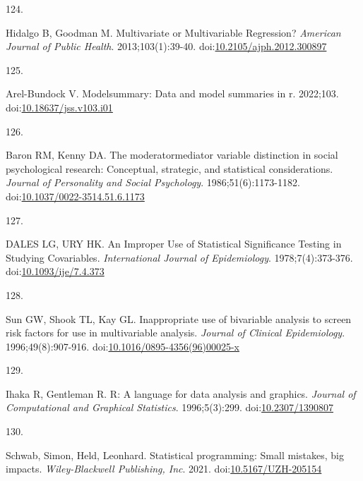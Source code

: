\documentclass[
]{book}
\newlength{\cslhangindent}
\newlength{\csllabelwidth}
\newlength{\cslentryspacingunit} %
\newenvironment{CSLReferences}[2] %
 {%
  \setlength{\parindent}{0pt}
  \ifodd #1
  \let\oldpar\par
  \def\par{\hangindent=\cslhangindent\oldpar}
  \fi
  \setlength{\parskip}{#2\cslentryspacingunit}
 }%
 {}
\newcommand{\CSLLeftMargin}[1]{\parbox[t]{\csllabelwidth}{#1}}
\newcommand{\CSLRightInline}[1]{\parbox[t]{\linewidth - \csllabelwidth}{#1}\break}
\begin{document}
\begin{CSLReferences}{0}{0}
\leavevmode{}%
\CSLLeftMargin{124. }%
\CSLRightInline{Hidalgo B, Goodman M. Multivariate or Multivariable Regression? \emph{American Journal of Public Health}. 2013;103(1):39-40. doi:\href{https://doi.org/10.2105/ajph.2012.300897}{10.2105/ajph.2012.300897}}

\leavevmode{}%
\CSLLeftMargin{125. }%
\CSLRightInline{Arel-Bundock V. {\textbraceleft}Modelsummary{\textbraceright}: Data and model summaries in {\textbraceleft}r{\textbraceright}. 2022;103. doi:\href{https://doi.org/10.18637/jss.v103.i01}{10.18637/jss.v103.i01}}

\leavevmode{}%
\CSLLeftMargin{126. }%
\CSLRightInline{Baron RM, Kenny DA. The moderator{\textendash}mediator variable distinction in social psychological research: Conceptual, strategic, and statistical considerations. \emph{Journal of Personality and Social Psychology}. 1986;51(6):1173-1182. doi:\href{https://doi.org/10.1037/0022-3514.51.6.1173}{10.1037/0022-3514.51.6.1173}}

\leavevmode{}%
\CSLLeftMargin{127. }%
\CSLRightInline{DALES LG, URY HK. An Improper Use of Statistical Significance Testing in Studying Covariables. \emph{International Journal of Epidemiology}. 1978;7(4):373-376. doi:\href{https://doi.org/10.1093/ije/7.4.373}{10.1093/ije/7.4.373}}

\leavevmode{}%
\CSLLeftMargin{128. }%
\CSLRightInline{Sun GW, Shook TL, Kay GL. Inappropriate use of bivariable analysis to screen risk factors for use in multivariable analysis. \emph{Journal of Clinical Epidemiology}. 1996;49(8):907-916. doi:\href{https://doi.org/10.1016/0895-4356(96)00025-x}{10.1016/0895-4356(96)00025-x}}

\leavevmode{}%
\CSLLeftMargin{129. }%
\CSLRightInline{Ihaka R, Gentleman R. R: A language for data analysis and graphics. \emph{Journal of Computational and Graphical Statistics}. 1996;5(3):299. doi:\href{https://doi.org/10.2307/1390807}{10.2307/1390807}}

\leavevmode{}%
\CSLLeftMargin{130. }%
\CSLRightInline{Schwab, Simon, Held, Leonhard. Statistical programming: Small mistakes, big impacts. \emph{Wiley-Blackwell Publishing, Inc}. 2021. doi:\href{https://doi.org/10.5167/UZH-205154}{10.5167/UZH-205154}}


\end{CSLReferences}
\end{document}
